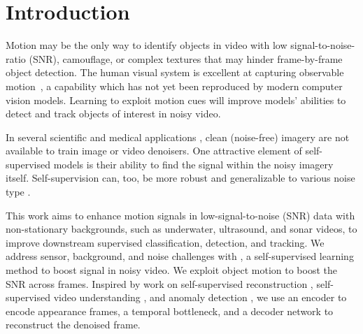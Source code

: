 \section{Introduction}
\label{sec:intro}
Motion may be the only way to identify objects in video with low signal-to-noise-ratio (SNR), camouflage, or complex textures that may hinder frame-by-frame object detection. The human visual system is excellent at capturing observable motion~\cite{giese2003neuro}, a capability which has not yet been reproduced by modern computer vision models. Learning to exploit motion cues will improve models' abilities to detect and track objects of interest in noisy video.

In several scientific \cite{Holste2024} and medical applications \cite{sundararajan2018DL4Bio, dargan2020DL4Applications}, clean (noise-free) imagery are not available to train image or video denoisers. One attractive element of self-supervised models is their ability to find the signal within the noisy imagery itself. Self-supervision can, too, be more robust and generalizable to various noise type \cite{shi_how_2022, marks2024closer}.

This work aims to enhance motion signals in low-signal-to-noise (SNR) data with non-stationary backgrounds, such as underwater, ultrasound, and sonar videos, to improve downstream supervised classification, detection, and tracking. We address sensor, background, and noise challenges with \NAME{}, a self-supervised learning method to boost signal in noisy video. We exploit object motion to boost the SNR across frames. Inspired by work on self-supervised reconstruction \cite{khalil2024learning, sun2022bkind}, self-supervised video understanding \cite{recasens2021broaden}, and anomaly detection  \cite{yang2023anom, liu2018anom}, we use an encoder to encode appearance frames, a temporal bottleneck, and a decoder network to reconstruct the denoised frame. 

